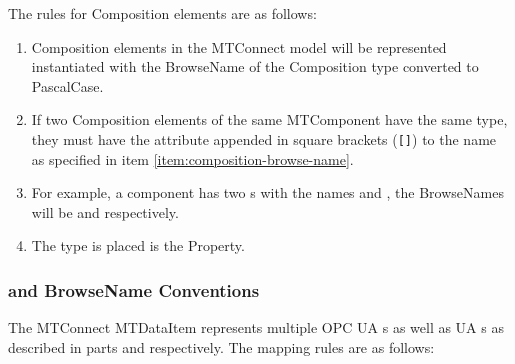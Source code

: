 The rules for \gls{Composition} elements are as follows:

\begin{enumerate}
  \item  \gls{Composition} elements in the MTConnect model will be represented instantiated with the \gls{BrowseName} of the \gls{Composition} \gls{type} converted to \gls{PascalCase}. \label{item:composition-browse-name}
  \item If two \gls{Composition} elements of the same \gls{MTComponent} have the same \gls{type}, they must have the  attribute appended in square brackets (\texttt{[]}) to the name as specified in item \ref{item:composition-browse-name}.
  \item For example, a component has two s with the names  and , the \glspl{BrowseName} will be  and  respectively.
  \item The type is placed is the  \gls{Property}.
\end{enumerate}

\subsubsection{  and \gls{BrowseName} Conventions}
\label{sec:data-item-conventions}

The MTConnect \gls{MTDataItem} represents multiple OPC UA s as well as UA s as described in parts \cite{UAPart8} and \cite{UAPart9} respectively. The mapping rules are as follows:

